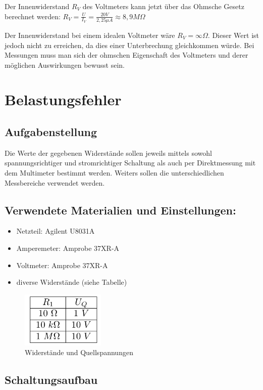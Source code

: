 \documentclass[12pt,a4paper,titlepage]{article}
\begin{document}
\noindent Der Innenwiderstand $R_V$ des Voltmeters kann jetzt über das Ohmsche Gesetz berechnet werden: $R_V = \frac{U}{I_V} = \frac{20V}{2,25\mu A} \approx 8,9M\Omega$

\noindent Der Innenwiderstand bei einem idealen Voltmeter wäre $R_V = \infty\Omega$. Dieser Wert ist jedoch nicht zu erreichen, da dies einer Unterbrechung gleichkommen würde. Bei Messungen muss man sich der ohmschen Eigenschaft des Voltmeters und derer möglichen Auswirkungen bewusst sein.



\newpage
\section{Belastungsfehler}

\subsection{Aufgabenstellung}
Die Werte der gegebenen Widerstände sollen jeweils mittels sowohl spannungsrichtiger und stromrichtiger Schaltung als auch per Direktmessung mit dem Multimeter bestimmt werden. Weiters sollen die unterschiedlichen Messbereiche verwendet werden.

\subsection{Verwendete Materialien und Einstellungen:}
\begin{itemize}
  \item Netzteil: Agilent U8031A
  \item Amperemeter: Amprobe 37XR-A
  \item Voltmeter: Amprobe 37XR-A
  \item diverse Widerstände (siehe Tabelle)
\end{itemize}

\begin{figure}[H]
  \centering
  \label{Figure2.2.1}
  \includegraphics[width=40mm]{widerstandtabelle.png}
  \caption{Widerstände und Quellspannungen}
\end{figure}

\subsection{Schaltungsaufbau}
\end{document}
